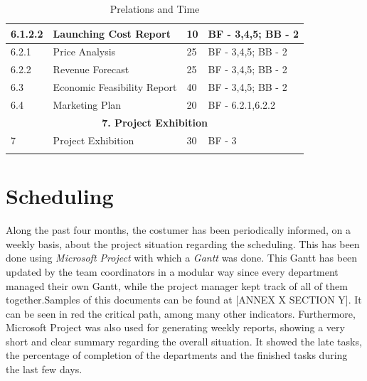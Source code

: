 \begin{longtable}{ | p{1.3cm} | p{5cm} | p{3cm} | p{3.5cm} |}
6.1.2.2 & Launching Cost Report  & 10 & BF - 3,4,5; BB - 2 \\ \hline
6.2.1 & Price Analysis & 25 & BF - 3,4,5; BB - 2 \\ \hline
6.2.2 & Revenue Forecast & 25 & BF - 3,4,5; BB - 2 \\ \hline
6.3 & Economic Feasibility Report & 40 & BF - 3,4,5; BB - 2  \\ \hline
6.4 & Marketing Plan & 20 & BF - 6.2.1,6.2.2 \\ \hline
\multicolumn{4}{|c|}{\textbf{7. Project Exhibition}} \\ \hline
7 & Project Exhibition &30 & BF - 3 \\ \hline
\caption{Prelations and Time} \\
\end{longtable}

\section{Scheduling}
Along the past four months, the costumer has been periodically informed, on a weekly basis, about the project situation regarding the scheduling. This has been done using \textit{Microsoft Project} with which a \textit{Gantt} was done. This Gantt has been updated by the team coordinators in a modular way since every department managed their own Gantt, while the project manager kept track of all of them together.Samples of this documents can be found at [{ANNEX X SECTION Y}]. It can be seen in red the critical path, among many other indicators. Furthermore, Microsoft Project was also used for generating weekly reports, showing a very short and clear summary regarding the overall situation. It showed the late tasks, the percentage of completion of the departments and the finished tasks during the last few days.